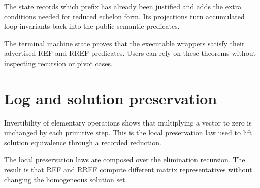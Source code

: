 \begin{definition}
\label{def:echelon-state}
\leanok
{}
The state records which prefix has already been justified and adds the extra conditions needed
for reduced echelon form.  Its projections turn accumulated loop invariants back into the
public semantic predicates.
\end{definition}

\begin{theorem}
\label{thm:echelon-correctness}
\leanok
{}
The terminal machine state proves that the executable wrappers satisfy their advertised REF and
RREF predicates.  Users can rely on these theorems without inspecting recursion or pivot cases.
\end{theorem}

\chapter{Log and solution preservation}

\begin{theorem}
\label{thm:primitive-solution-preservation}
\leanok
{}
Invertibility of elementary operations shows that multiplying a vector to zero is unchanged by
each primitive step.  This is the local preservation law used to lift solution equivalence
through a recorded reduction.
\end{theorem}

\begin{theorem}
\label{thm:reduction-solution-preservation}
\leanok
{}
The local preservation laws are composed over the elimination recursion.  The result is that
REF and RREF compute different matrix representatives without changing the homogeneous solution
set.
\end{theorem}

